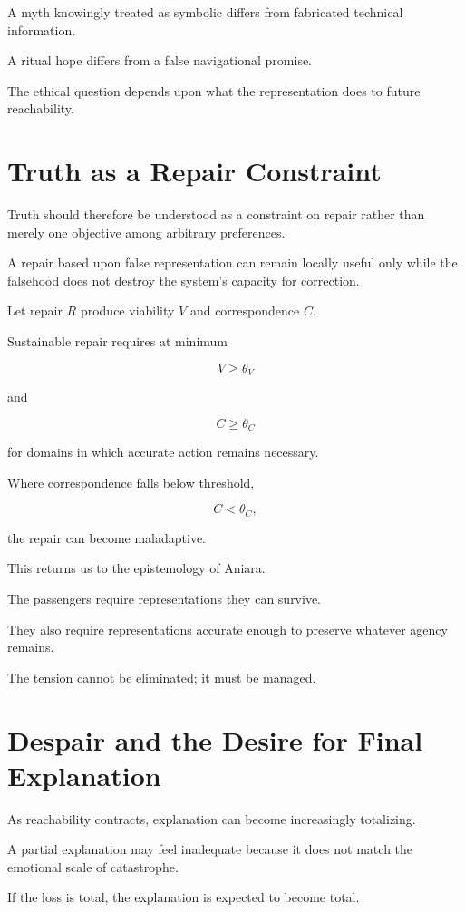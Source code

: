 \documentclass[11pt,oneside]{book}
\theoremstyle{definition}
\theoremstyle{remark}
\begin{document}
A myth knowingly treated as symbolic differs from fabricated technical information.

A ritual hope differs from a false navigational promise.

The ethical question depends upon what the representation does to future reachability.

\section{Truth as a Repair Constraint}

Truth should therefore be understood as a constraint on repair rather than merely one objective among arbitrary preferences.

A repair based upon false representation can remain locally useful only while the falsehood does not destroy the system's capacity for correction.

Let repair \(R\) produce viability \(V\) and correspondence \(C\).

Sustainable repair requires at minimum

\[
V\geq\theta_V
\]

and

\[
C\geq\theta_C
\]

for domains in which accurate action remains necessary.

Where correspondence falls below threshold,

\[
C<\theta_C,
\]

the repair can become maladaptive.

This returns us to the epistemology of Aniara.

The passengers require representations they can survive.

They also require representations accurate enough to preserve whatever agency remains.

The tension cannot be eliminated; it must be managed.

\section{Despair and the Desire for Final Explanation}

As reachability contracts, explanation can become increasingly totalizing.

A partial explanation may feel inadequate because it does not match the emotional scale of catastrophe.

If the loss is total, the explanation is expected to become total.
\end{document}
